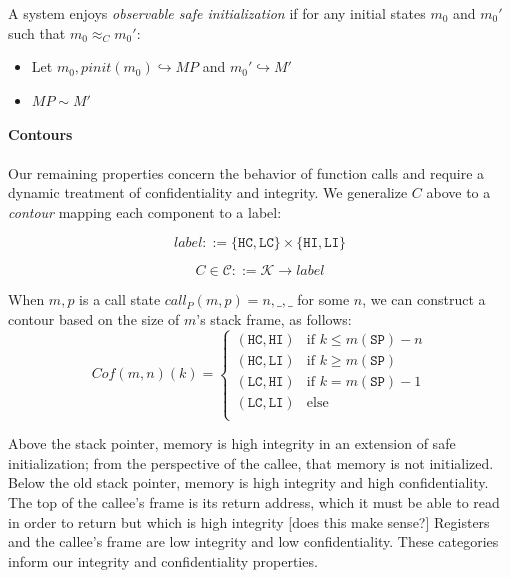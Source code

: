 \documentclass[conference]{IEEEtran}
\newcommand{\MP}{\mathit{MP}}
\begin{document}
      A system enjoys {\it observable safe initialization} if for any initial states \(m_0\)
      and \(m_0'\) such that \(m_0 \approx_C m_0'\):

      \begin{itemize}
        \item Let \(m_0,\mathit{pinit}(m_0) \hookrightarrow \MP\) and \(m_0' \hookrightarrow M'\)
        \item \(\MP \sim M'\)
      \end{itemize}

    \paragraph{Contours}

      Our remaining properties concern the behavior of function calls and require a dynamic treatment
      of confidentiality and integrity. We generalize \(C\) above to a {\it contour} mapping each component
      to a label:

      \[\mathit{label} ::= \{\mathtt{HC},\mathtt{LC}\} \times \{\mathtt{HI},\mathtt{LI}\}\]

      \[C \in \mathcal{C} ::= \mathcal{K} \rightarrow \mathit{label}\]

      When \(m,p\) is a call state \(\mathit{call}_P(m,p) = n,\_,\_\) for some \(n\),
      we can construct a contour based on the size of \(m\)'s stack frame, as follows:
      \[\mathit{Cof}(m,n)(k) =
      \begin{cases}
        (\mathtt{HC},\mathtt{HI}) & \text{if } k \leq m(\mathtt{SP}) - n \\
        (\mathtt{HC},\mathtt{LI}) & \text{if } k \geq m(\mathtt{SP}) \\
        (\mathtt{LC},\mathtt{HI}) & \text{if } k = m(\mathtt{SP}) - 1 \\
        (\mathtt{LC},\mathtt{LI}) & \text{else} \\
      \end{cases}\]

      Above the stack pointer, memory is high integrity in an extension of safe initialization;
      from the perspective of the callee, that memory is not initialized. Below the old stack
      pointer, memory is high integrity and high confidentiality. The top of the callee's frame
      is its return address, which it must be able to read in order to return but which is
      high integrity [does this make sense?] Registers and the callee's frame are low integrity
      and low confidentiality. These categories inform our integrity and confidentiality properties.
\end{document}
